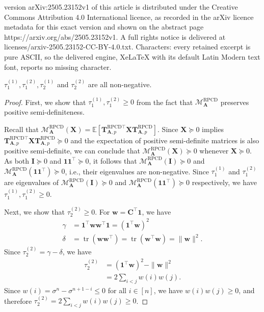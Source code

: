 \documentclass[10pt,a4paper]{amsart}
\DeclareMathOperator{\tr}{tr}
\def\mA{{\bm{A}}}
\def\mC{{\bm{C}}}
\def\mI{{\bm{I}}}
\def\mT{{\bm{T}}}
\def\mX{{\bm{X}}}
\def\vone{{\bm{1}}}
\def\vw{{\bm{w}}}
\newcommand{\E}{\mathbb{E}}
\newcommand{\MARPCD}{\mathcal{M}_{\bm{A}}^{\RPCD}} %
\newcommand{\RPCD}{\text{RPCD}} %
\begin{document}
version arXiv:2505.23152v1 of this article is distributed under the Creative Commons Attribution 4.0 International licence, as recorded in the arXiv licence metadata for this exact version and shown on the abstract page https://arxiv.org/abs/2505.23152v1. A full rights notice is delivered at licenses/arxiv-2505.23152-CC-BY-4.0.txt. Characters: every retained excerpt is pure ASCII, so the delivered engine, XeLaTeX with its default Latin Modern text font, reports no missing character.
\begin{lemma}
    \label{lem:taunonnegative}
    $\tau_1^{(1)}, \tau_1^{(2)}, \tau_2^{(1)}$ and $\tau_2^{(2)}$ are all non-negative.
\end{lemma}

\begin{proof}
    First, we show that $\tau_1^{(1)}, \tau_1^{(2)} \ge 0$ from the fact that $\MARPCD$ preserves positive semi-definiteness. 
    
    Recall that $\MARPCD(\mX) = \E[\mT_{\mA, p}^{\RPCD \top} \mX \mT_{\mA, p}^{\RPCD}]$.
    Since $\mX \succeq 0$ implies $\mT_{\mA, p}^{\RPCD \top} \mX \mT_{\mA, p}^{\RPCD} \succeq 0$ and the expectation of positive semi-definite matrices is also positive semi-definite, we can conclude that $\MARPCD(\mX) \succeq 0$ whenever $\mX \succeq 0$.
    As both $\mI \succeq 0$ and $\vone \vone^{\top} \succeq 0$, it follows that $\MARPCD(\mI) \succeq 0$ and $\MARPCD(\vone \vone^{\top}) \succeq 0$, i.e., their eigenvalues are non-negative.
    Since $\tau_1^{(1)}$ and $\tau_1^{(2)}$ are eigenvalues of $\MARPCD(\mI) \succeq 0$ and $\MARPCD(\vone \vone^{\top}) \succeq 0$ respectively, we have $\tau_1^{(1)}, \tau_1^{(2)} \ge 0$.
    
    Next, we show that $\tau_2^{(2)}\ge 0$. For $\vw = \mC^{\top} \vone$, we have 
    \begin{align*}
        \gamma &= \vone^{\top} \vw \vw^{\top} \vone = (\vone^{\top} \vw)^2 \\
        \delta &= \tr(\vw \vw^{\top}) = \tr(\vw^{\top} \vw) = \|\vw\|^2.
    \end{align*}
    Since $\tau_2^{(2)} = \gamma - \delta$, we have
    \begin{align*}
        \tau_2^{(2)} &= (\vone^{\top} \vw)^2 - \|\vw\|^2 \\
        &= 2\sum_{i<j} w(i) w(j).
    \end{align*}
    Since $w(i) = \sigma^n - \sigma^{n+1-i} \le 0$ for all $i\in [n]$, we have $w(i) w(j) \ge 0$, and therefore $\tau_2^{(2)} = 2\sum_{i<j} w(i) w(j) \ge 0$.


\end{proof}
\end{document}
